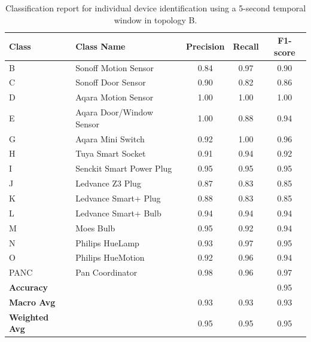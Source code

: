 \begin{table}[t]
    \centering
    \begin{tabular}{llccc}
    \toprule
    \textbf{Class} & \textbf{Class Name} & \textbf{Precision} & \textbf{Recall} & \textbf{F1-score} \\
    \midrule
  B & Sonoff Motion Sensor  & 0.84 & 0.97 & 0.90 \\
  C & Sonoff Door Sensor & 0.90 & 0.82 & 0.86 \\
  D & Aqara Motion Sensor & 1.00 & 1.00 & 1.00 \\
  E & Aqara Door/Window Sensor & 1.00 & 0.88 & 0.94 \\
  G & Aqara Mini Switch & 0.92 & 1.00 & 0.96 \\
  H & Tuya Smart Socket & 0.91 & 0.94 & 0.92 \\
  I & Senckit Smart Power Plug & 0.95 & 0.95 & 0.95 \\
  J & Ledvance Z3 Plug & 0.87 & 0.83 & 0.85 \\
  K & Ledvance Smart+ Plug  & 0.88 & 0.83 & 0.85 \\
  L & Ledvance Smart+ Bulb  & 0.94 & 0.94 & 0.94 \\
  M & Moes Bulb & 0.95 & 0.92 & 0.94 \\
  N & Philips HueLamp  & 0.93 & 0.97 & 0.95 \\
  O & Philips HueMotion  & 0.92 & 0.96 & 0.94 \\ 
  PANC &Pan Coordinator & 0.98 & 0.96 & 0.97 \\
    \midrule
    \textbf{Accuracy}     &&       &       & 0.95 \\
    \textbf{Macro Avg}    && 0.93 & 0.93 & 0.93  \\
    \textbf{Weighted Avg} && 0.95 & 0.95 & 0.95 \\
    \bottomrule
    \end{tabular}
    \caption{Classification report for individual device identification using a 5-second temporal window in topology B.}
    \label{tab:device_name_classification_topoB}
\end{table}


